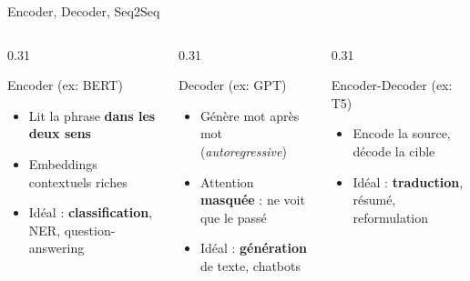 \documentclass[aspectratio=169, 10pt]{beamer}
\begin{document}
\begin{frame}{Encoder, Decoder, Seq2Seq}
  \begin{columns}[T]
    \begin{column}{0.31\textwidth}
      \begin{block}{Encoder (ex: BERT)}
        \begin{itemize}
          \item[\textcolor{jedy_example}{$+$}] Lit la phrase
                \textbf{dans les deux sens}
          \item[\textcolor{jedy_example}{$+$}] Embeddings contextuels
                riches
          \item Idéal : \textbf{classification},
                NER, question-answering
        \end{itemize}
      \end{block}
    \end{column}
    \begin{column}{0.31\textwidth}
      \begin{block}{Decoder (ex: GPT)}
        \begin{itemize}
          \item[\textcolor{jedy_example}{$+$}] Génère mot après mot
                (\textit{autoregressive})
          \item Attention \textbf{masquée} : ne voit que le passé
          \item Idéal : \textbf{génération} de texte, chatbots
        \end{itemize}
      \end{block}
    \end{column}
    \begin{column}{0.31\textwidth}
      \begin{block}{Encoder-Decoder (ex: T5)}
        \begin{itemize}
          \item[\textcolor{jedy_example}{$+$}] Encode la source,
                décode la cible
          \item Idéal : \textbf{traduction},
                résumé, reformulation
        \end{itemize}
      \end{block}
    \end{column}
  \end{columns}
  \medskip
  \begin{center}
    \begin{tikzpicture}[font=\scriptsize,
      blk/.style={draw, rounded corners=4pt, align=center,
                  minimum width=2.4cm, minimum height=0.7cm},
      arr/.style={->, thick, gray!60}]

\end{tikzpicture}
\end{center}
\end{frame}
\end{document}
